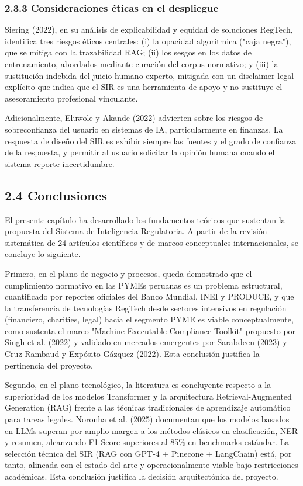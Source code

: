\documentclass[12pt,a4paper,oneside]{report}
\begin{document}
\subsubsection{2.3.3 Consideraciones éticas en el
despliegue}\label{consideraciones-uxe9ticas-en-el-despliegue}

Siering (2022), en su análisis de explicabilidad y equidad de soluciones
RegTech, identifica tres riesgos éticos centrales: (i) la opacidad
algorítmica ("caja negra"), que se mitiga con la trazabilidad RAG; (ii)
los sesgos en los datos de entrenamiento, abordados mediante curación
del corpus normativo; y (iii) la sustitución indebida del juicio humano
experto, mitigada con un disclaimer legal explícito que indica que el
SIR es una herramienta de apoyo y no sustituye el asesoramiento
profesional vinculante.

Adicionalmente, Eluwole y Akande (2022) advierten sobre los riesgos de
sobreconfianza del usuario en sistemas de IA, particularmente en
finanzas. La respuesta de diseño del SIR es exhibir siempre las fuentes
y el grado de confianza de la respuesta, y permitir al usuario solicitar
la opinión humana cuando el sistema reporte incertidumbre.

\subsection{2.4 Conclusiones}\label{conclusiones}

El presente capítulo ha desarrollado los fundamentos teóricos que
sustentan la propuesta del Sistema de Inteligencia Regulatoria. A partir
de la revisión sistemática de 24 artículos científicos y de marcos
conceptuales internacionales, se concluye lo siguiente.

Primero, en el plano de negocio y procesos, queda demostrado que el
cumplimiento normativo en las PYMEs peruanas es un problema estructural,
cuantificado por reportes oficiales del Banco Mundial, INEI y PRODUCE, y
que la transferencia de tecnologías RegTech desde sectores intensivos en
regulación (financiero, charities, legal) hacia el segmento PYME es
viable conceptualmente, como sustenta el marco "Machine-Executable
Compliance Toolkit" propuesto por Singh et al. (2022) y validado en
mercados emergentes por Sarabdeen (2023) y Cruz Rambaud y Expósito
Gázquez (2022). Esta conclusión justifica la pertinencia del proyecto.

Segundo, en el plano tecnológico, la literatura es concluyente respecto
a la superioridad de los modelos Transformer y la arquitectura
Retrieval-Augmented Generation (RAG) frente a las técnicas tradicionales
de aprendizaje automático para tareas legales. Noronha et al. (2025)
documentan que los modelos basados en LLMs superan por amplio margen a
los métodos clásicos en clasificación, NER y resumen, alcanzando
F1-Score superiores al 85\% en benchmarks estándar. La selección técnica
del SIR (RAG con GPT-4 + Pinecone + LangChain) está, por tanto, alineada
con el estado del arte y operacionalmente viable bajo restricciones
académicas. Esta conclusión justifica la decisión arquitectónica del
proyecto.
\end{document}
